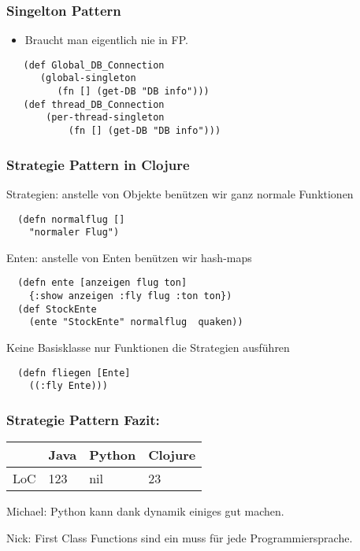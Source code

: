 \documentclass[compress, blue]{beamer}
\begin{document}

\begin{frame}[fragile]\frametitle{Singelton Pattern}
 \begin{itemize}
    \item Braucht man eigentlich nie in FP.
 \end{itemize}

\begin{lstlisting}
   (def Global_DB_Connection 
      (global-singleton 
         (fn [] (get-DB "DB info")))
   (def thread_DB_Connection 
       (per-thread-singleton 
           (fn [] (get-DB "DB info")))
\end{lstlisting}
\end{frame}
    
    
    



\begin{frame}[fragile]\frametitle{Strategie Pattern in Clojure}
 
Strategien: anstelle von Objekte benützen wir ganz normale Funktionen
\begin{lstlisting}
  (defn normalflug []
    "normaler Flug")
\end{lstlisting} 
\pause
Enten: anstelle von Enten  benützen wir hash-maps
\begin{lstlisting}
  (defn ente [anzeigen flug ton]
    {:show anzeigen :fly flug :ton ton})
  (def StockEnte 
    (ente "StockEnte" normalflug  quaken))
\end{lstlisting}
\pause
Keine Basisklasse nur Funktionen die Strategien ausführen 
\begin{lstlisting}
  (defn fliegen [Ente]
    ((:fly Ente)))
\end{lstlisting} 
\end{frame}





\begin{frame}\frametitle{Strategie Pattern Fazit:}
  \begin{tabular}{l | l l l}
     & Java &  Python & Clojure  \\
     \hline
    LoC & 123 &  nil & 23  \\
  \end{tabular}
  \vspace{.5cm}

  \begin{block}{Michael:}
    Python kann dank dynamik einiges gut machen.
  \end{block}

  \begin{block}{Nick: }
    First Class Functions sind ein muss für jede Programmiersprache.
  \end{block}
\end{frame}
\end{document}
